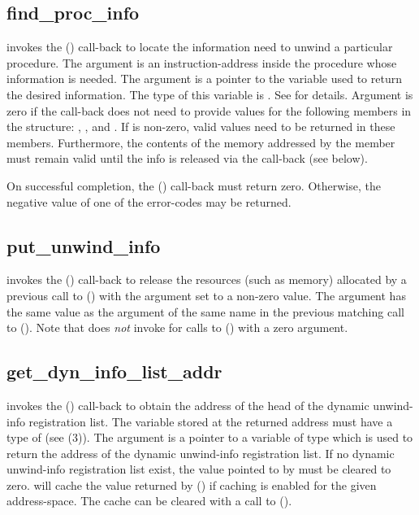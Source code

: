 \documentclass{article}
\begin{document}
\subsection{find\_proc\_info}

 invokes the () call-back to
locate the information need to unwind a particular procedure.  The
 argument is an instruction-address inside the procedure whose
information is needed.  The  argument is a pointer to the
variable used to return the desired information.  The type of this
variable is .  See
 for details.  Argument
 is zero if the call-back does not need to
provide values for the following members in the
 structure: ,
, and .  If
 is non-zero, valid values need to be returned
in these members.  Furthermore, the contents of the memory addressed
by the  member must remain valid until the info is
released via the  call-back (see below).

On successful completion, the () call-back must
return zero.  Otherwise, the negative value of one of the
 error-codes may be returned.

\subsection{put\_unwind\_info}

 invokes the () call-back to
release the resources (such as memory) allocated by a previous call to
() with the  argument
set to a non-zero value.  The  argument has the same value as
the argument of the same name in the previous matching call to
().  Note that  does \emph{not}
invoke  for calls to ()
with a zero  argument.


\subsection{get\_dyn\_info\_list\_addr}

 invokes the ()
call-back to obtain the address of the head of the dynamic unwind-info
registration list.  The variable stored at the returned address must
have a type of  (see
(3)).  The  argument is a pointer
to a variable of type  which is used to return the
address of the dynamic unwind-info registration list.  If no dynamic
unwind-info registration list exist, the value pointed to by
 must be cleared to zero.   will cache the
value returned by () if caching is
enabled for the given address-space.  The cache can be cleared with a
call to ().
\end{document}
